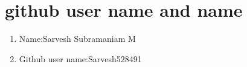 \documentclass[12pt,a4paper]{article}
\begin{document}
\section{github user name and name}
\begin{enumerate}
\item Name:Sarvesh Subramaniam M 
\item Github user name:Sarvesh528491
\end{enumerate}




\end{document}
